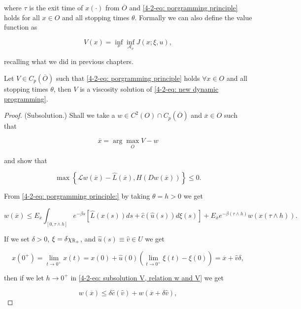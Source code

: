 where $\tau$ is the exit time of $x(\cdot)$ from $\overline{O}$ and \eqref{4-2-eq: porgramming principle} holds for all $x\in O$ and all stopping times $\theta$. Formally we can also define the value function as

\begin{equation}
    V(x) = \inf_{\nu}\inf_{\mathcal{A}_{\nu}} J(x;\xi,u),
\end{equation}

recalling what we did in previous chapters.

\begin{theorem}
    Let $V\in C_p(\overline{O})$ such that \eqref{4-2-eq: porgramming principle} holds $\forall x\in O$ and all stopping times $\theta$, then $V$ is a viscosity solution of \eqref{4-2-eq: new dynamic programming}.

    \begin{proof}
        (Subsolution.) Shall we take a $w\in C^2(O)\cap C_p(\overline{O})$ and $\overline{x}\in O$ such that
        
        \[\overline{x} = \arg \max_{\overline{O}} V-w\]

        and show that 

        \begin{equation}\label{4-2-eq: subsol prop}
            \max\left\{\mathcal{L}w(\overline{x}) - \hat{L}(\overline{x}), H(Dw(\overline{x}))\right\} \leq 0.
        \end{equation}

        From \eqref{4-2-eq: porgramming principle:} by taking $\theta = h>0$ we get

        \begin{equation}\label{4-2-eq: subsolution V, relation w and V}
            w(\overline{x}) \leq E_{\overline{x}} \int_{[0,\tau\land h]} e^{-\beta s}\left[\hat{L}(x(s))ds + \hat{c}(\hat{u}(s))d\xi(s)\right]+E_{\overline{x}}e^{-\beta(\tau\land h)}w(x(\tau\land h)).
        \end{equation}

        If we set $\delta>0$, $\xi=\delta\chi_{\mathbb{R}_+}$, and $\hat{u}(s)\equiv \hat{v}\in U$ we get

        \[x(0^+)=\lim_{t\to 0^+}x(t) = x(0) + \hat{u}(0)(\lim_{t\to 0^+}\xi(t)-\xi(0))=\overline{x}+\hat{v}\delta,\]

        then if we let $h\to0^+$ in \eqref{4-2-eq: subsolution V, relation w and V} we get

        \begin{equation}
            w(\overline{x}) \leq \delta\hat{c}(\hat{v}) + w(\overline{x} + \delta\hat{v}),
        \end{equation}


\end{proof}
\end{theorem}

